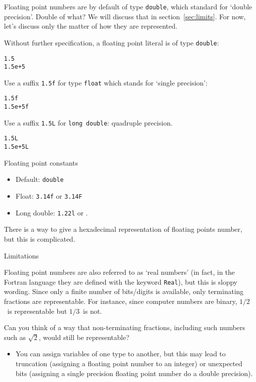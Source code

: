 Floating point numbers are by default of type \lstinline{double},
which standard for `double precision'. Double of what?
We will discuss that in section~\ref{sec:limits}.
For now, let's discuss only the matter of how they are represented.

Without further specification, a floating point literal is of type \lstinline{double}:
\begin{lstlisting}
1.5
1.5e+5
\end{lstlisting}
Use a suffix  \lstinline{1.5f} for type \lstinline{float} which stands for `single precision':
\begin{lstlisting}
1.5f
1.5e+5f
\end{lstlisting}
Use a suffix  \lstinline{1.5L} for \lstinline{long double}: quadruple precision.
\begin{lstlisting}
1.5L
1.5e+5L
\end{lstlisting}

\begin{slide}{Floating point constants}
  \label{sl:float-vars}
  \begin{itemize}
  \item Default: \lstinline{double}
  \item Float: \lstinline{3.14f} or \lstinline{3.14F}
  \item Long double: \lstinline{1.22l} or .
  \end{itemize}
\end{slide}

There is a way to give a 
hexadecimal representation of floating points number, but this is complicated.

 {Limitations}

Floating point numbers are also referred to as `real numbers'
(in fact, in the Fortran language they are defined
with the keyword \lstinline{Real}),
but this is sloppy wording.
Since only a finite number of bits/digits is available,
only terminating fractions are representable.
For instance, since computer numbers are binary,
$1/2$~is representable but $1/3$~is not.

\begin{exercise}
  \label{ex:float-irrat}
  Can you think of a way that non-terminating fractions,
  including such numbers such as $\sqrt 2$,
  would still be representable?
\end{exercise}

\begin{itemize}
\item You can assign variables of one type to another, but this may
  lead to truncation (assigning a floating point number to an integer)
  or unexpected bits (assigning a single precision floating point
  number do a double precision).
\end{itemize}

